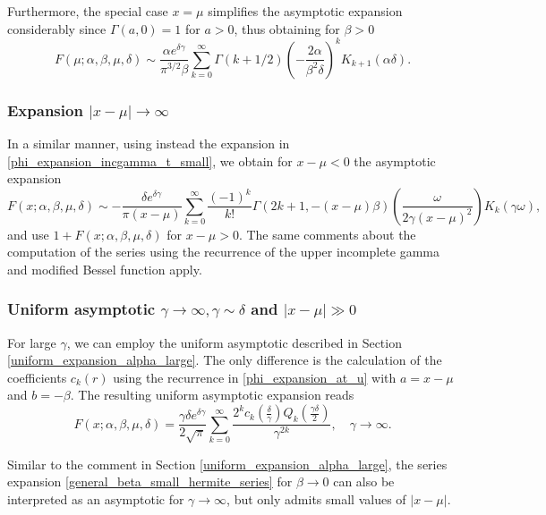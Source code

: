 \documentclass[10pt,a4paper,oneside]{article}
\numberwithin{equation}{section}
\begin{document}
Furthermore, the special case $x=\mu$ simplifies the asymptotic expansion considerably since $\Gamma(a, 0) = 1$ for $a > 0$, thus obtaining for $\beta > 0$
\begin{equation}\label{expansion_x_eq_mu_large_delta}
F(\mu; \alpha, \beta, \mu, \delta) \sim \frac{\alpha e^{\delta \gamma}}{\pi^{3/2} \beta}\sum_{k=0}^{\infty}\Gamma(k + 1/2)\left(-\frac{2\alpha}{\beta^2 \delta}\right)^k K_{k+1}(\alpha \delta).
\end{equation}

\subsubsection{Expansion $|x-\mu| \to \infty$}
In a similar manner, using instead the expansion in \eqref{phi_expansion_incgamma_t_small}, we obtain for $x-\mu < 0$ the asymptotic expansion
\begin{equation}\label{general_asymptotic_xmu}
F(x; \alpha, \beta, \mu, \delta) \sim -\frac{\delta e^{\delta\gamma}}{\pi (x-\mu)}\sum_{k=0}^{\infty}\frac{(-1)^k}{k!}\Gamma(2k + 1, -(x-\mu)\beta) \left(\frac{\omega}{2\gamma (x-\mu)^2}\right) K_k(\gamma \omega),
\end{equation}
and use $1 + F(x; \alpha, \beta, \mu, \delta)$ for $x-\mu > 0$. The same comments about the computation of the series using the recurrence of the upper incomplete gamma and modified Bessel function apply.

\subsubsection{Uniform asymptotic $\gamma \to \infty, \gamma \sim \delta$ and $|x-\mu| \gg 0$}
For large $\gamma$, we can employ the uniform asymptotic described in Section \ref{uniform_expansion_alpha_large}. The only difference is the calculation of the coefficients $c_k(r)$ using the recurrence in \eqref{phi_expansion_at_u} with $a = x-\mu$ and $b = -\beta$. The resulting uniform asymptotic expansion reads
\begin{equation}
F(x; \alpha, \beta, \mu, \delta) = \frac{\gamma \delta e^{\delta \gamma}}{2\sqrt{\pi}} \sum_{k=0}^{\infty} \frac{2^k c_k\left(\frac{\delta}{\gamma}\right) Q_k\left(\frac{\gamma\delta}{2}\right)}{\gamma^{2k}}, \quad \gamma \to \infty.
\end{equation}

Similar to the comment in Section \ref{uniform_expansion_alpha_large}, the series expansion \eqref{general_beta_small_hermite_series} for $\beta \to 0$ can also be interpreted as an asymptotic for $\gamma \to \infty$, but only admits small values of $|x-\mu|$.
\end{document}
